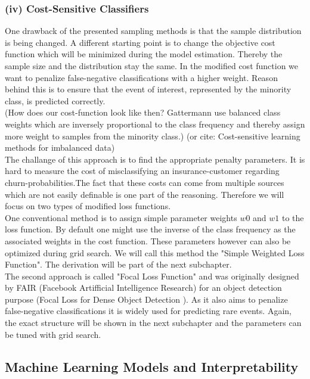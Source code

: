 \documentclass[12pt,titlepage]{article}
\begin{document}
\subsubsection*{(iv) Cost-Sensitive Classifiers} \label{Cost-Sensitive Classifiers}
One drawback of the presented sampling methods is that the sample distribution is being changed. A different starting point is to change the objective cost function which
will be minimized during the model estimation. Thereby the sample size and the distribution stay the same. In the modified cost function we want to penalize false-negative
classifications with a higher weight. Reason behind this is to ensure that the event of interest, represented by the minority class, is predicted correctly. \\
(How does our cost-function look like then? Gattermann use balanced class weights which are inversely proportional to the class frequency and thereby assign more weight to samples
from the minority class.) (or cite: Cost-sensitive learning methods for imbalanced data)  \\
The challange of this approach is to find the appropriate penalty parameters. It is hard to measure the cost of misclassifying an insurance-customer regarding churn-probabilities.The fact that these costs can come from multiple sources which are not easily definable is one part of the reasoning. Therefore we will focus on two types of modified loss functions.\\
One conventional method is to assign simple parameter weights $w0$ and $w1$ to the loss function. By default one might use the inverse of the class frequency as the associated weights in the cost function. These parameters however can also be optimized during grid search. We will call this method the "Simple Weighted Loss Function". The derivation will be part of the next subchapter.\\
The second approach is called "Focal Loss Function" and was originally designed by FAIR (Facebook Artifficial Intelligence Research) for an object detection purpose (Focal Loss for Dense Object Detection
). As it also aims to penalize false-negative classifications it is widely used for predicting rare events. Again, the exact structure will be shown in the next subchapter and the parameters can be tuned with grid search.\\


\subsection{Machine Learning Models and Interpretability} \par
\end{document}
